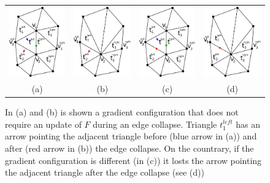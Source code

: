 \documentclass[preprint,5p,times,onecolumn]{article}
\begin{document}
\begin{figure}
	\centering
	\begin{tabular}{c c c c}
		\includegraphics[width=0.22\linewidth]{images/gradient_left_before} &
		\includegraphics[width=0.22\linewidth]{images/gradient_left_after} &
		\includegraphics[width=0.22\linewidth]{images/gradient_left_before2} &
		\includegraphics[width=0.22\linewidth]{images/gradient_left_after2} \\
		(a) & (b) & (c) & (d) \\
	\end{tabular}
	\label{fig:arrows}
	\caption{In (a) and (b) is shown a gradient configuration that does not require an update of $F$ during an edge collapse. Triangle $t_1^{left}$ has an arrow pointing the adjacent triangle before (blue arrow in (a)) and after (red arrow in (b)) the edge collapse. On the countrary, if the gradient configuration is different (in (c)) it losts the arrow pointing the adjacent triangle after the edge collapse (see (d)) }
\end{figure}
\end{document}
